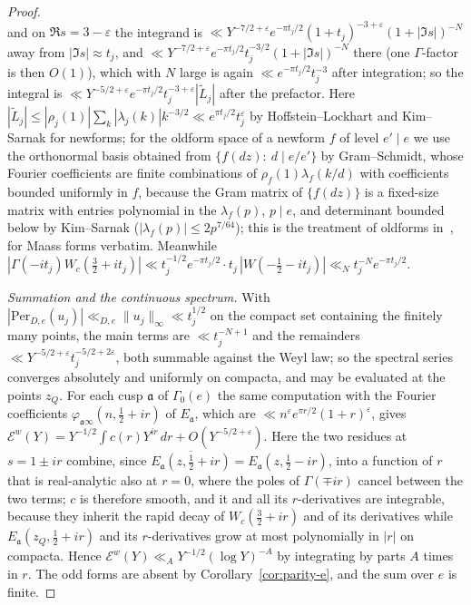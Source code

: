 \documentclass[11pt,a4paper]{article}
\theoremstyle{remark}\newtheorem{remark}[theorem]{Remark}
\begin{document}
\begin{proof}
\[\]
and on $\Re s=3-\varepsilon$ the integrand is $\ll Y^{-7/2+\varepsilon}e^{-\pi t_j/2}(1+t_j)^{-3+\varepsilon}(1+|\Im s|)^{-N}$ away
from $|\Im s|\approx t_j$, and $\ll Y^{-7/2+\varepsilon}e^{-\pi t_j/2}t_j^{-3/2}(1+|\Im s|)^{-N}$ there (one $\Gamma$-factor is
then $O(1)$), which with $N$ large is again $\ll e^{-\pi t_j/2}t_j^{-3}$ after integration; so the integral is
$\ll Y^{-5/2+\varepsilon}e^{-\pi t_j/2}t_j^{-3+\varepsilon}|\tilde L_j|$ after the prefactor. Here
$|\tilde L_j|\le|\rho_j(1)|\sum_k|\lambda_j(k)|k^{-3/2}\ll e^{\pi t_j/2}t_j^{\varepsilon}$ by Hoffstein--Lockhart and Kim--Sarnak
for newforms; for the oldform space of a newform $f$ of level $e'\mid e$ we use the orthonormal basis obtained from
$\{f(dz):\ d\mid e/e'\}$ by Gram--Schmidt, whose Fourier coefficients are finite combinations of $\rho_f(1)\lambda_f(k/d)$
with coefficients bounded uniformly in $f$, because the Gram matrix of $\{f(dz)\}$ is a fixed-size matrix with entries
polynomial in the $\lambda_f(p)$, $p\mid e$, and determinant bounded below by Kim--Sarnak ($|\lambda_f(p)|\le2p^{7/64}$);
this is the treatment of oldforms in~\cite{IwaniecLuoSarnak2000}, for Maass forms verbatim. Meanwhile
$|\Gamma(-it_j)W_c(\tfrac32+it_j)|\ll t_j^{-1/2}e^{-\pi t_j/2}\cdot t_j\,|W(-\tfrac12-it_j)|\ll_Nt_j^{-N}e^{-\pi t_j/2}$.

\emph{Summation and the continuous spectrum.} With $|\mathrm{Per}_{D,e}(u_j)|\ll_{D,e}\|u_j\|_\infty\ll t_j^{1/2}$ on the compact
set containing the finitely many points, the main terms are $\ll t_j^{-N+1}$ and the remainders $\ll Y^{-5/2+\varepsilon}t_j^{-5/2+2\varepsilon}$,
both summable against the Weyl law; so the spectral series converges absolutely and uniformly on compacta, and may be
evaluated at the points $z_Q$. For each cusp $\mathfrak a$ of $\Gamma_0(e)$ the same computation with the Fourier
coefficients $\varphi_{\mathfrak a\infty}(n,\tfrac12+ir)$ of $E_{\mathfrak a}$, which are $\ll n^{\varepsilon}e^{\pi r/2}(1+r)^{\varepsilon}$,
gives $\mathcal E^w(Y)=Y^{-1/2}\int c(r)Y^{ir}\,dr+O(Y^{-5/2+\varepsilon})$. Here the two residues at $s=1\pm ir$ combine,
since $\overline{E_{\mathfrak a}(z,\tfrac12+ir)}=E_{\mathfrak a}(z,\tfrac12-ir)$, into a function of $r$ that is real-analytic
also at $r=0$, where the poles of $\Gamma(\mp ir)$ cancel between the two terms; $c$ is therefore smooth, and it and all
its $r$-derivatives are integrable, because they inherit the rapid decay of $W_c(\tfrac32+ir)$ and of its derivatives while
$E_{\mathfrak a}(z_Q,\tfrac12+ir)$ and its $r$-derivatives grow at most polynomially in $|r|$ on compacta. Hence
$\mathcal E^w(Y)\ll_AY^{-1/2}(\log Y)^{-A}$ by integrating by parts $A$ times in $r$. The odd forms are absent by Corollary~\ref{cor:parity-e}, and the sum over
$e$ is finite.
\end{proof}
\end{document}
